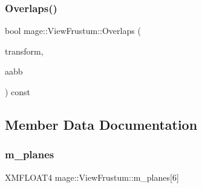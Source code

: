 \hypertarget{classmage_1_1_view_frustum_a302c7b49592bc9e5a297270da0c8b6ec}{}\label{classmage_1_1_view_frustum_a302c7b49592bc9e5a297270da0c8b6ec} 
\subsubsection{\texorpdfstring{Overlaps()}{Overlaps()}\hspace{0.1cm}{\footnotesize\ttfamily [2/2]}}
{\footnotesize\ttfamily bool mage\+::\+View\+Frustum\+::\+Overlaps (\begin{DoxyParamCaption}\item[{const Transform \&}]{transform,  }\item[{const \hyperlink{structmage_1_1_a_a_b_b}{A\+A\+BB} \&}]{aabb }\end{DoxyParamCaption}) const}



\subsection{Member Data Documentation}
\hypertarget{classmage_1_1_view_frustum_aa5d8b90bfc005bd19566983401ccd511}{}\label{classmage_1_1_view_frustum_aa5d8b90bfc005bd19566983401ccd511} 
\subsubsection{\texorpdfstring{m\+\_\+planes}{m\_planes}}
{\footnotesize\ttfamily X\+M\+F\+L\+O\+A\+T4 mage\+::\+View\+Frustum\+::m\+\_\+planes\mbox{[}6\mbox{]}\hspace{0.3cm}{\ttfamily [private]}}

